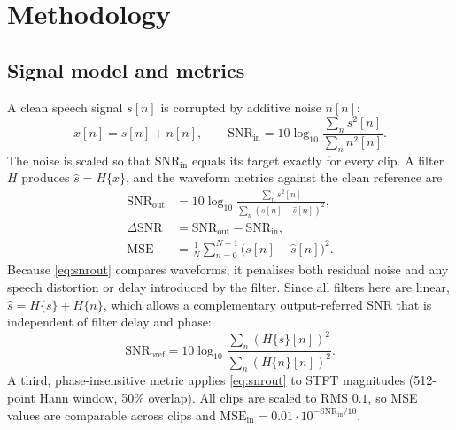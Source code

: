 \documentclass[conference]{IEEEtran}
\begin{document}
\section{Methodology}
\subsection{Signal model and metrics}
A clean speech signal $s[n]$ is corrupted by additive noise $n[n]$:
\begin{equation}
x[n]=s[n]+n[n],\qquad \mathrm{SNR_{in}}=10\log_{10}\frac{\sum_n s^2[n]}{\sum_n n^2[n]}.
\label{eq:model}
\end{equation}
The noise is scaled so that $\mathrm{SNR_{in}}$ equals its target exactly for every clip. A filter $H$ produces $\hat{s}=H\{x\}$, and the waveform metrics against the clean reference are
\begin{align}
\mathrm{SNR_{out}}&=10\log_{10}\frac{\sum_n s^2[n]}{\sum_n (s[n]-\hat{s}[n])^2},\label{eq:snrout}\\
\Delta\mathrm{SNR}&=\mathrm{SNR_{out}}-\mathrm{SNR_{in}},\label{eq:dsnr}\\
\mathrm{MSE}&=\frac{1}{N}\sum_{n=0}^{N-1}\big(s[n]-\hat{s}[n]\big)^2.\label{eq:mse}
\end{align}
Because \eqref{eq:snrout} compares waveforms, it penalises both residual noise and any speech distortion or delay introduced by the filter. Since all filters here are linear, $\hat{s}=H\{s\}+H\{n\}$, which allows a complementary output-referred SNR that is independent of filter delay and phase:
\begin{equation}
\mathrm{SNR_{oref}}=10\log_{10}\frac{\sum_n (H\{s\}[n])^2}{\sum_n (H\{n\}[n])^2}.
\label{eq:oref}
\end{equation}
A third, phase-insensitive metric applies \eqref{eq:snrout} to STFT magnitudes (512-point Hann window, 50\% overlap). All clips are scaled to RMS $0.1$, so MSE values are comparable across clips and $\mathrm{MSE_{in}}=0.01\cdot10^{-\mathrm{SNR_{in}}/10}$.
\end{document}
